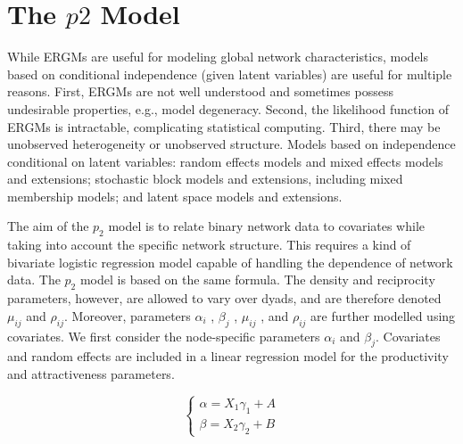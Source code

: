 \documentclass[12pt]{ociamthesis}  %
\begin{document}
	\section{The $p2$ Model}
	
	While ERGMs are useful for modeling global network characteristics, models based on conditional independence (given latent variables) are useful for multiple reasons. First, ERGMs are not well understood and sometimes possess undesirable properties, e.g., model degeneracy. Second, the likelihood function of ERGMs is intractable, complicating statistical computing. Third, there may be unobserved heterogeneity or unobserved structure.
	Models based on independence conditional on latent variables: random effects models and mixed effects models and extensions; stochastic block models and extensions, including mixed membership models; and latent space models and extensions.
	
	The aim of the $p_{2}$ model is to relate binary network data to covariates while taking into account the specific network structure. This requires a kind of bivariate logistic regression model capable of handling the dependence of network data.
	The $p_{2}$ model is based on the same formula. The density and reciprocity parameters, however, are allowed to vary over dyads, and are therefore denoted $\mu_{ij} $ and $\rho_{ij}$. Moreover, parameters $\alpha_{i}$ , $\beta_{j}$ , $\mu_{ij}$ , and $\rho_{ij}$ are further modelled using covariates.
	We first consider the node-specific parameters $\alpha_{i}$ and $\beta_{j}$. Covariates and random effects are included in a linear regression model for the productivity and attractiveness parameters.
	
	\begin{equation}
	\begin{cases}
	\alpha = X_{1} \gamma_{1} + A \\
	\beta = X_{2} \gamma_{2} + B
	\end{cases}
	\end{equation}
\end{document}
